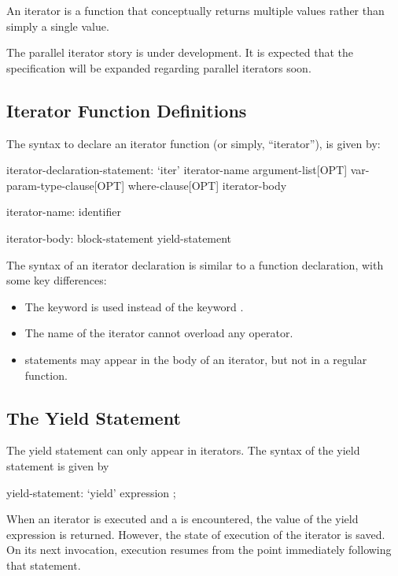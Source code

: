 \label{Iterators}

An iterator is a function that conceptually returns multiple values
rather than simply a single value.

\begin{openissue}
The parallel iterator story is under development.  It is expected that
the specification will be expanded regarding parallel iterators soon.
\end{openissue}

\subsection{Iterator Function Definitions}
\label{Iterator_Function_Definitions}

The syntax to declare an iterator function (or simply, ``iterator''), is given
by:
\begin{syntax}
iterator-declaration-statement:
  `iter' iterator-name argument-list[OPT] var-param-type-clause[OPT] where-clause[OPT]
  iterator-body

iterator-name:
  identifier

iterator-body:
  block-statement
  yield-statement
\end{syntax}

The syntax of an iterator declaration is similar to a function declaration, with
some key differences:
\begin{itemize}
\item The keyword  is used instead of the keyword .
\item The name of the iterator cannot overload any operator.
\item {} statements may appear in the body of an iterator, but not in
a regular function.
\end{itemize}

\subsection{The Yield Statement}
\label{The_Yield_Statement}

The yield statement can only appear in iterators.  The syntax of the
yield statement is given by
\begin{syntax}
yield-statement:
  `yield' expression ;
\end{syntax}

When an iterator is executed and a  is encountered, the value of the yield
expression is returned.  However, the state of execution of the iterator is
saved.  On its next invocation, execution resumes from the point immediately
following that  statement.


